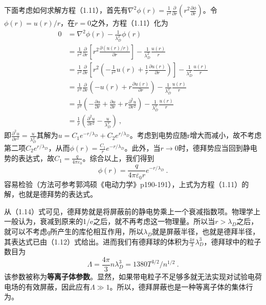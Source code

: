 下面考虑如何求解方程（1.11），首先有$\nabla^2\phi(r)=\frac{1}{r^2}\frac{\partial}{\partial r}\left(r^2\frac{\partial\phi}{\partial r}\right)$。令$\phi(r)=u(r)/r$，在$r=0$之外，方程（1.11）化为
			\begin{equation} 
			\begin{aligned}
			0&=\nabla^2\phi(r)-\frac{1}{\lambda_D^2}\phi(r)\\
			&=\frac{1}{r^2}\frac{\partial}{\partial r}\left[r^2\frac{\partial(u(r)/r)}{\partial r}\right]-\frac{1}{\lambda_D^2}\frac{u(r)}{r}\\
			&=\frac{1}{r^2}\frac{\partial}{\partial r}\left[r^2\left(-\frac{1}{r^2}u(r)+\frac{1}{r}\frac{\partial u(r)}{\partial r}\right)\right]-\frac{1}{\lambda_D^2}\frac{u(r)}{r}\\
			&=\frac{1}{r^2}\frac{\partial}{\partial r}\left(-u(r)+r\frac{\partial u(r)}{\partial r}\right)-\frac{1}{\lambda_D^2}\frac{u(r)}{r}\\
			&=\frac{1}{r^2}\left(-\frac{\partial u}{\partial r}+\frac{\partial u}{\partial r}+r\frac{\partial^2 u}{\partial r^2}\right)-\frac{1}{\lambda_D^2}\frac{u(r)}{r}\\
			&=\frac{1}{r}\left(\frac{\partial^2 u}{\partial r^2}-\frac{u}{\lambda_D^2}\right)~,
			\end{aligned}
			\end{equation}
即$\frac{\partial^2 u}{\partial r^2}=\frac{u}{\lambda_D^2}$其解为$u=C_1 e^{-r/\lambda_D}+C_2 e^{r/\lambda_D}$。考虑到电势应随r增大而减小，故不考虑第二项$C_2 e^{r/\lambda_D}$，从而$\phi(r)=\frac{C_1}{r}e^{-r/\lambda_D}$。此外，当$r\to 0$时，德拜势应当回到静电势的表达式，故$C_1=\frac{q}{4\pi \varepsilon_0}$。综合以上，我们得到
			\begin{equation} 
			\boxed{\phi(r)=\frac{q}{4\pi \varepsilon_0 r}e^{-r/\lambda_D}~.}
			\end{equation}
容易检验（方法可参考郭鸿硕《电动力学》p190-191），上式为方程（1.11）的解，也就是德拜势的表达式。
			
从（1.14）式可见，德拜势就是将屏蔽前的静电势乘上一个衰减指数项。物理学上一般认为，衰减到原来的1/e之后，就不再考虑这一物理量。所以当$r>\lambda_D$之后，就可以不考虑$q$所产生的库伦相互作用，所以$\lambda_D$就是屏蔽半径，也就是德拜半径，其表达式已由（1.12）式给出。进而我们有德拜球的体积为$\frac{4\pi}{3}\lambda_D^3$，德拜球中的粒子数目为
			\begin{equation} 
			\boxed{\varLambda=\frac{4\pi}{3}n\lambda_D^3=1380T^{3/2}/n^{1/2}~.}
			\end{equation}
该参数被称为\textbf{等离子体参数}。显然，如果带电粒子不足够多就无法实现对试验电荷电场的有效屏蔽，因此应有$\varLambda\gg 1$。所以，德拜屏蔽也是一种等离子体的集体行为。
			
